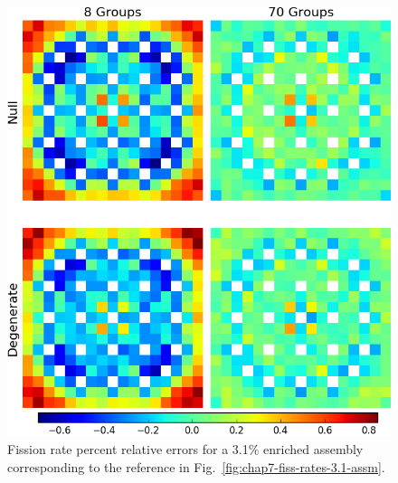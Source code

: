 \begin{figure}[h!]
\centering
\includegraphics[width=\linewidth]{figures/quantification/assm-31/fiss-err}
\vspace{2mm}
\caption[Fission rate errors for a 3.1\% enriched assembly]{Fission rate percent relative errors for a 3.1\% enriched assembly corresponding to the reference in Fig.~\ref{fig:chap7-fiss-rates-3.1-assm}.}
\label{fig:chap8-assm-3.1-fiss-err}
\end{figure}

\clearpage

